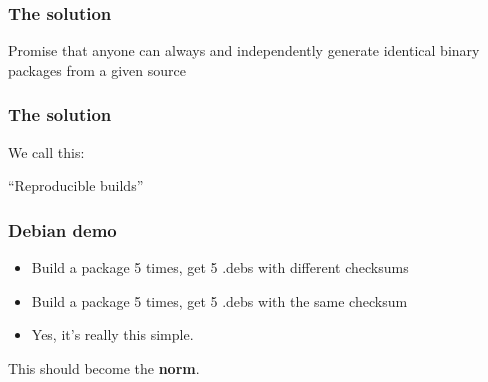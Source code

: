 \documentclass[14pt]{beamer}
\newif\ifplacelogo
\begin{document}
\begin{frame}
 \frametitle{The solution}

 \begin{center}
 \Large{
 Promise that anyone can always and independently generate
 identical binary packages from a given source}
\end{center}
\end{frame}


\begin{frame}
 \frametitle{The solution}

 \begin{center}
 We call this:

 \Huge{ “Reproducible builds” }
 \end{center}
\end{frame}

\placelogotrue

\begin{frame}
 \frametitle{Debian demo}
 \begin{itemize}
 \item Build a package 5 times, get 5 .debs with different checksums
 \item<2-3> Build a package 5 times, get 5 .debs with the same checksum\\
 \item<3>{Yes, it's really this simple.}
 \end{itemize}
%
%
\end{frame}

\placelogofalse

\begin{frame}[plain]
\begin{center}
 \Huge{This should become the \textbf{norm}.}

\end{center}
\end{frame}
\end{document}
